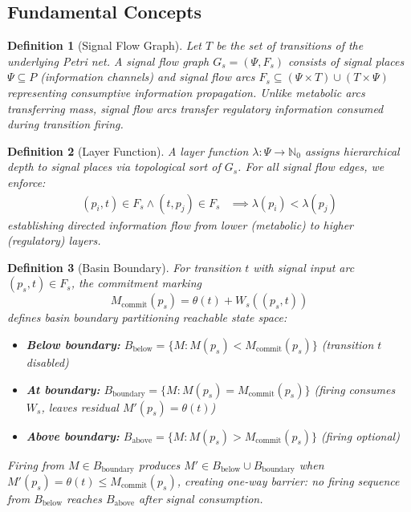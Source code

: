 \documentclass[10pt,letterpaper]{article}
\newtheorem{definition}{Definition}
\begin{document}
\subsection{Fundamental Concepts}

\begin{definition}[Signal Flow Graph]
Let $T$ be the set of transitions of the underlying Petri net. A signal flow graph $G_s = (\Psi, F_s)$ consists of signal places $\Psi \subseteq P$ (information channels) and signal flow arcs $F_s \subseteq (\Psi \times T) \cup (T \times \Psi)$ representing consumptive information propagation. Unlike metabolic arcs transferring mass, signal flow arcs transfer regulatory information consumed during transition firing.
\end{definition}

\begin{definition}[Layer Function]
A layer function $\lambda: \Psi \rightarrow \mathbb{N}_0$ assigns hierarchical depth to signal places via topological sort of $G_s$. For all signal flow edges, we enforce:
\begin{align*}
(p_i,t) \in F_s \wedge (t,p_j) \in F_s &\implies \lambda(p_i) < \lambda(p_j)
\end{align*}
establishing directed information flow from lower (metabolic) to higher (regulatory) layers.
\end{definition}

\begin{definition}[Basin Boundary]
For transition $t$ with signal input arc $(p_s,t) \in F_s$, the commitment marking
\begin{equation*}
M_{\text{commit}}(p_s) = \theta(t) + W_s((p_s,t))
\end{equation*}
defines basin boundary partitioning reachable state space:
\begin{itemize}
\item \textbf{Below boundary:} $B_{\text{below}} = \{M : M(p_s) < M_{\text{commit}}(p_s)\}$ (transition $t$ disabled)
\item \textbf{At boundary:} $B_{\text{boundary}} = \{M : M(p_s) = M_{\text{commit}}(p_s)\}$ (firing consumes $W_s$, leaves residual $M'(p_s) = \theta(t)$)
\item \textbf{Above boundary:} $B_{\text{above}} = \{M : M(p_s) > M_{\text{commit}}(p_s)\}$ (firing optional)
\end{itemize}
Firing from $M \in B_{\text{boundary}}$ produces $M' \in B_{\text{below}} \cup B_{\text{boundary}}$ when
$M'(p_s) = \theta(t) \leq M_{\text{commit}}(p_s)$,
creating one-way barrier: no firing sequence from $B_{\text{below}}$ reaches $B_{\text{above}}$ after signal consumption.
\end{definition}
\end{document}
